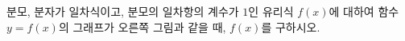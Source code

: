 \hspace*{2mm}\begin{minipage}[t]{\dimexpr\linewidth-2mm\relax}\vspace{0pt}
\noindent\begin{minipage}[t]{0.58\linewidth}\vspace{0pt}\raggedright 분모, 분자가 일차식이고, 분모의 일차항의 계수가 $1$인 유리식 $f(x)$에 대하여 함수 $y=f(x)$의 그래프가 오른쪽 그림과 같을 때, $f(x)$를 구하시오.\end{minipage}\hfill\begin{minipage}[t]{0.4\linewidth}\vspace{0pt}\centering \resizebox{\ifdim\width>\linewidth\linewidth\else\width\fi}{!}{}\end{minipage}\par\end{minipage}
